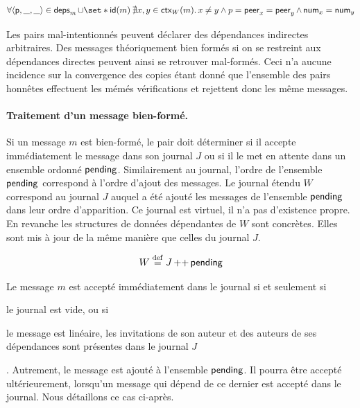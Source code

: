 \begin{equation}\label{eq:honest-verif}
    \forall \tuple*{\trm{p}, \_, \_} \in \trm{deps}_m \cup \set*{\trm{id}(m)} \:\nexists x, y \in \trm{ctx}_W(m) \qsep x \neq y \land p = \trm{peer}_x = \trm{peer}_y \land \trm{num}_x = \trm{num}_y
\end{equation}

\begin{remark}
Les pairs mal-intentionnés peuvent déclarer des dépendances indirectes arbitraires.
Des messages théoriquement bien formés si on se restreint aux dépendances directes peuvent ainsi se retrouver mal-formés.
Ceci n'a aucune incidence sur la convergence des copies étant donné que l'ensemble des pairs honnêtes effectuent les mémés vérifications et rejettent donc les même messages.
\end{remark}


\paragraph{Traitement d'un message bien-formé.} Si un message $m$ est bien-formé, le pair doit déterminer si il accepte immédiatement le message dans son journal $J$ ou si il le met en attente dans un ensemble ordonné $\operatorname{\mathsf{pending}}$.
Similairement au journal, l'ordre de l'ensemble $\operatorname{\mathsf{pending}}$ correspond à l'ordre d'ajout des messages.
Le journal étendu $W$ correspond au journal $J$ auquel a été ajouté les messages de l'ensemble $\operatorname{\mathsf{pending}}$ dans leur ordre d'apparition.
Ce journal est virtuel, il n'a pas d'existence propre.
En revanche les structures de données dépendantes de $W$ sont concrètes.
Elles sont mis à jour de la même manière que celles du journal $J$.

\begin{equation*}
    W \overset{\mathrm{def}}{=} J \operatorname{++} \operatorname{\mathsf{pending}}
\end{equation*}

Le message $m$ est accepté immédiatement dans le journal si et seulement si \begin{inlinelist}\item le journal est vide, ou si \item le message est linéaire, les invitations de son auteur et des auteurs de ses dépendances sont présentes dans le journal $J$\end{inlinelist}.
Autrement, le message est ajouté à l'ensemble $\operatorname{\mathsf{pending}}$.
Il pourra être accepté ultérieurement, lorsqu'un message qui dépend de ce dernier est accepté dans le journal.
Nous détaillons ce cas ci-après.

